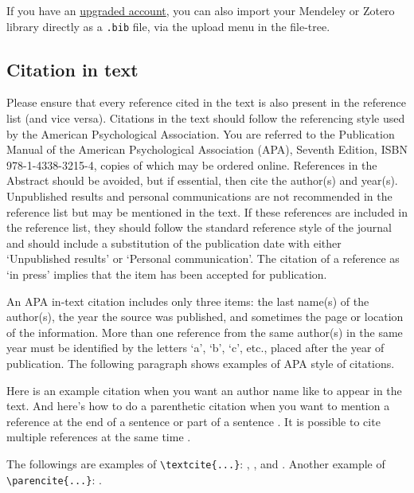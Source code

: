 \documentclass[12pt,a4paper]{article}
\begin{document}
If you have an \href{https://www.overleaf.com/user/subscription/plans}{upgraded account}, you can also import your Mendeley or Zotero library directly as a \verb|.bib| file, via the upload menu in the file-tree.

\subsection{Citation in text}
Please ensure that every reference cited in the text is also present in the reference list (and vice versa). Citations in the text should follow the referencing style used by the American Psychological Association. You are referred to the Publication Manual of the American Psychological Association (APA), Seventh Edition, ISBN 978-1-4338-3215-4, copies of which may be ordered online. References in the Abstract should be avoided, but if essential, then cite the author(s) and year(s). Unpublished results and personal communications are not recommended in the reference list but may be mentioned in the text. If these references are included in the reference list, they should follow the standard reference style of the journal and should include a substitution of the publication date with either ‘Unpublished results’ or ‘Personal communication’. The citation of a reference as ‘in press’ implies that the item has been accepted for publication. 

An APA in-text citation includes only three items: the last name(s) of the author(s), the year the source was published, and sometimes the page or location of the information. More than one reference from the same author(s) in the same year must be identified by the letters ‘a’, ‘b’, ‘c’, etc., placed after the year of publication. The following paragraph shows examples of APA style of citations.

Here is an example citation when you want an author name like \textcite{collins2011a} to appear in the text. And here's how to do a parenthetic citation when you want to mention a reference at the end of a sentence or part of a sentence \parencite{collins2013}. It is possible to cite multiple references at the same time \parencite{collins2011b,collins2016,lunn2007a,lunn2007b,ross2006,shannon1948}.

The followings are examples of \verb+\textcite{...}+: \textcite{rahman2019centroidb}, \textcite{krizhevsky2012imagenet, horvath2018dna}, and \textcite{lecun2015deep, zhang2018fine, ravi2016deep}. Another example of \verb+\parencite{...}+: \parencite{bahdanau2014neural,imboden2018cardiorespiratory,motiian2017unified,murphy2012machine,ji20123d}.
\end{document}

